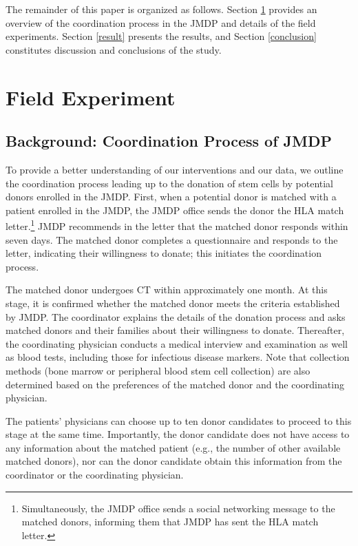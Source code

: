 \documentclass[12pt, a4paper]{article}
\begin{document}
The remainder of this paper is organized as follows. Section \ref{experiment} provides an overview of the coordination process in the JMDP and details of the field experiments. Section \ref{result} presents the results, and Section \ref{conclusion} constitutes discussion and conclusions of the study.

\hypertarget{experiment}{%
\section{Field Experiment}\label{experiment}}

\hypertarget{background}{%
\subsection{Background: Coordination Process of JMDP}\label{background}}

To provide a better understanding of our interventions and our data, we outline the coordination process leading up to the donation of stem cells by potential donors enrolled in the JMDP. First, when a potential donor is matched with a patient enrolled in the JMDP, the JMDP office sends the donor the HLA match letter.\footnote{Simultaneously, the JMDP office sends a social networking message to the matched donors, informing them that JMDP has sent the HLA match letter.} JMDP recommends in the letter that the matched donor responds within seven days. The matched donor completes a questionnaire and responds to the letter, indicating their willingness to donate; this initiates the coordination process.

The matched donor undergoes CT within approximately one month. At this stage, it is confirmed whether the matched donor meets the criteria established by JMDP. The coordinator explains the details of the donation process and asks matched donors and their families about their willingness to donate. Thereafter, the coordinating physician conducts a medical interview and examination as well as blood tests, including those for infectious disease markers. Note that collection methods (bone marrow or peripheral blood stem cell collection) are also determined based on the preferences of the matched donor and the coordinating physician.

The patients' physicians can choose up to ten donor candidates to proceed to this stage at the same time. Importantly, the donor candidate does not have access to any information about the matched patient (e.g., the number of other available matched donors), nor can the donor candidate obtain this information from the coordinator or the coordinating physician.
\end{document}
